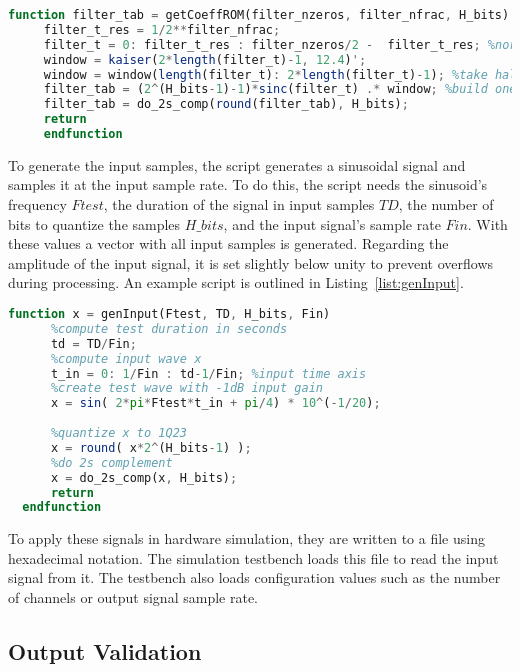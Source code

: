 \begin{lstlisting}[language=Octave, caption={Coefficients generation script}, label={list:getCoeffROM}, frame=single, breaklines=true]
  function filter_tab = getCoeffROM(filter_nzeros, filter_nfrac, H_bits)
     filter_t_res = 1/2**filter_nfrac;
     filter_t = 0: filter_t_res : filter_nzeros/2 -  filter_t_res; %normalized positive time axis
     window = kaiser(2*length(filter_t)-1, 12.4)';
     window = window(length(filter_t): 2*length(filter_t)-1); %take half window
     filter_tab = (2^(H_bits-1)-1)*sinc(filter_t) .* window; %build one sided impulse response filter table
     filter_tab = do_2s_comp(round(filter_tab), H_bits);
     return
     endfunction
\end{lstlisting}

To generate the input samples, the script generates a sinusoidal signal and
samples it at the input sample rate. To do this, the script needs the sinusoid's
frequency $Ftest$, the duration of the signal in input samples $TD$, the number
of bits to quantize the samples $H\_bits$, and the input signal's sample rate
$Fin$. With these values a vector with all input samples is generated. Regarding
the amplitude of the input signal, it is set slightly below unity to prevent
overflows during processing. An example script is outlined in
Listing~\ref{list:genInput}.

\begin{lstlisting}[language=Octave, caption={Input generation script}, label={list:genInput}, frame=single, breaklines=true]
  function x = genInput(Ftest, TD, H_bits, Fin)
      %compute test duration in seconds
      td = TD/Fin;
      %compute input wave x
      t_in = 0: 1/Fin : td-1/Fin; %input time axis
      %create test wave with -1dB input gain
      x = sin( 2*pi*Ftest*t_in + pi/4) * 10^(-1/20);
  
      %quantize x to 1Q23
      x = round( x*2^(H_bits-1) );
      %do 2s complement
      x = do_2s_comp(x, H_bits);
      return
  endfunction
\end{lstlisting}

To apply these signals in hardware simulation, they are written to a file using
hexadecimal notation. The simulation testbench loads this file to read the input
signal from it. The testbench also loads configuration values such as the number
of channels or output signal sample rate.

\subsection{Output Validation}
\label{subsection:output_script}

